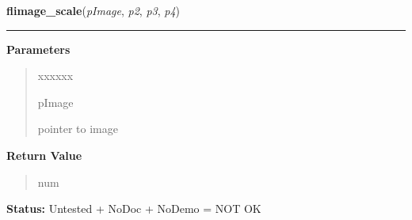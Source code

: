 \hspace{.8\funcindent}\begin{boxedminipage}{\funcwidth}

    \raggedright \textbf{flimage\_scale}(\textit{pImage}, \textit{p2}, \textit{p3}, \textit{p4})

    \vspace{-1.5ex}

    \rule{\textwidth}{0.5\fboxrule}
\setlength{\parskip}{2ex}
\setlength{\parskip}{1ex}
      \textbf{Parameters}
      \vspace{-1ex}

      \begin{quote}
        \begin{Ventry}{xxxxxx}

          \item[pImage]

          pointer to image

        \end{Ventry}

      \end{quote}

      \textbf{Return Value}
    \vspace{-1ex}

      \begin{quote}
      num

      \end{quote}

\textbf{Status:} Untested + NoDoc + NoDemo = NOT OK



    \end{boxedminipage}

    \label{xformslib:library:flimage_warp}

    \vspace{0.5ex}

